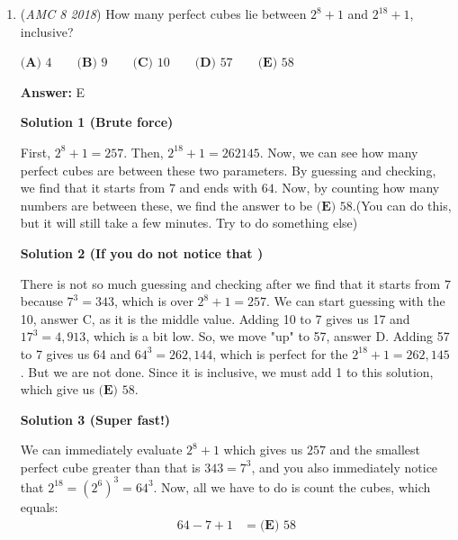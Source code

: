 \begin{enumerate}
 Next, the area of one of the cube’s faces is simply \( 4^2 = 16 \). So, \( R \) is:

 ${\left(\frac{8\sqrt6}{16}\right)^2}$= ${\boxed{\textbf{(C)}\frac{3}{2}}}$.

 
-jb2015007

 (Minor edits by FrankensteinQuixoteCabin)

 \textbf{Note} \href{https://artofproblemsolving.com/wiki/index.php?title=2008\_AMC\_10A\_Problems/Problem\_21}{Problem 21 of the 2008 AMC 10A} was nearly identical to this question, except that in this question you have to look for the square of the area, not the actual area.

 


	\item (\textit{AMC 8 2018}) How many perfect cubes lie between $2^8+1$ and $2^{18}+1$, inclusive?


 $\textbf{(A) }4\qquad\textbf{(B) }9\qquad\textbf{(C) }10\qquad\textbf{(D) }57\qquad \textbf{(E) }58$

 \textbf{Answer: }E



\textbf{Solution 1 (Brute force)}

First, $2^8+1=257$. Then, $2^{18}+1=262145$. Now, we can see how many perfect cubes are between these two parameters. By guessing and checking, we find that it starts from $7$ and ends with $64$. Now, by counting how many numbers are between these, we find the answer to be $\boxed{\textbf{(E) }58}$.(You can do this, but it will still take a few minutes. Try to do something else)

 



\textbf{Solution 2 (If you do not notice that )}

There is not so much guessing and checking after we find that it starts from $7$ because $7^3=343$, which is over $2^8+1=257$. We can start guessing with the 10, answer C, as it is the middle value. Adding 10 to 7 gives us 17 and $17^3 = 4,913$, which is a bit low. So, we move "up" to 57, answer D. Adding 57 to 7 gives us 64 and $64^3 = 262,144$, which is perfect for the $2^{18}+1=262,145$. But we are not done. Since it is inclusive, we must add 1 to this solution, which give us $\boxed{\textbf{(E) }58}$.

 



\textbf{Solution 3 (Super fast!)}

We can immediately evaluate $2^8+1$ which gives us $257$ and the smallest perfect cube greater than that is $343 = 7^3$, and you also immediately notice that $2^{18} = (2^6)^3 = 64^3$. Now, all we have to do is count the cubes, which equals:\begin{align}64-7+1 &= \boxed{\textbf{(E) }58}\end{align}


\end{enumerate}
